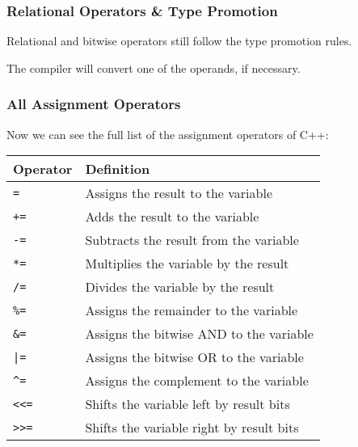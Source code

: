 \begin{frame}
\frametitle{Relational Operators \& Type Promotion}
Relational and bitwise operators still follow the type promotion rules.

The compiler will convert one of the operands, if necessary.

\end{frame}



\begin{frame}
\frametitle{All Assignment Operators}

Now we can see the full list of the assignment operators of C++:

\begin{center}
\begin{tabular}{l|l}
\textbf{Operator} & \textbf{Definition} \\ \hline
	\texttt{=} & Assigns the result to the variable\\ \hline
	\texttt{+=} & Adds the result to the variable\\ \hline
	\texttt{-=} & Subtracts the result from the variable\\ \hline
	\texttt{*=} & Multiplies the variable by the result\\ \hline
	\texttt{/=} & Divides the variable by the result\\ \hline
	\texttt{\%=} & Assigns the remainder to the variable\\ \hline
	\texttt{\&=} & Assigns the bitwise AND to the variable\\ \hline
	\texttt{|=} & Assigns the bitwise OR to the variable\\ \hline
	\texttt{\^{}=} & Assigns the complement to the variable\\ \hline
	\texttt{\textless\textless =} & Shifts the variable left by result bits\\ \hline
	\texttt{\textgreater\textgreater =} & Shifts the variable right by result bits\\
\end{tabular}
\end{center}
\end{frame}



